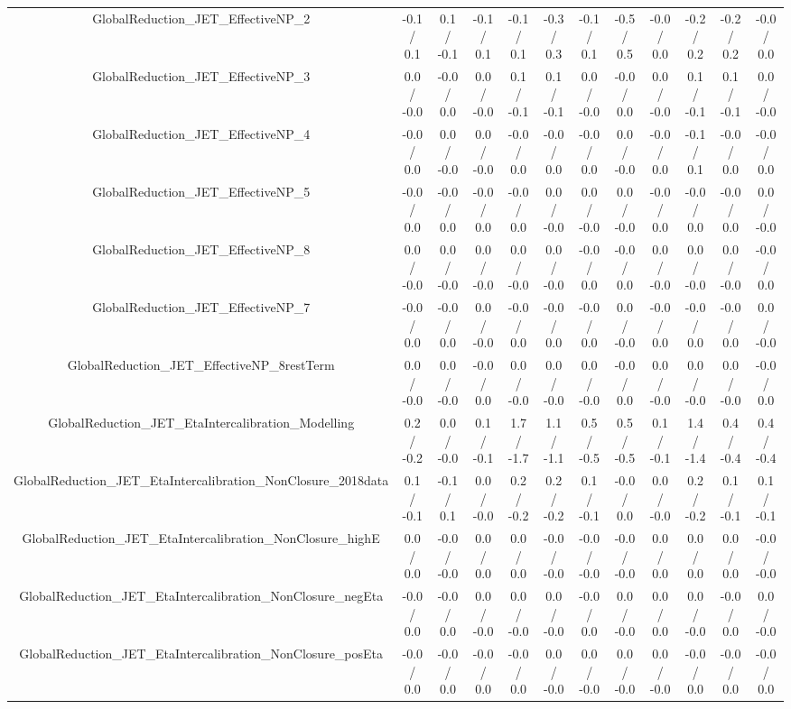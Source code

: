 \begin{table}[htbp]
\begin{center}
\begin{tabular}{|c|c|c|c|c|c|c|c|c|c|c|c|}
  GlobalReduction_JET_EffectiveNP_2 & -0.1 / 0.1 & 0.1 / -0.1 & -0.1 / 0.1 & -0.1 / 0.1 & -0.3 / 0.3 & -0.1 / 0.1 & -0.5 / 0.5 & -0.0 / 0.0 & -0.2 / 0.2 & -0.2 / 0.2 & -0.0 / 0.0 \\ 
  GlobalReduction_JET_EffectiveNP_3 & 0.0 / -0.0 & -0.0 / 0.0 & 0.0 / -0.0 & 0.1 / -0.1 & 0.1 / -0.1 & 0.0 / -0.0 & -0.0 / 0.0 & 0.0 / -0.0 & 0.1 / -0.1 & 0.1 / -0.1 & 0.0 / -0.0 \\ 
  GlobalReduction_JET_EffectiveNP_4 & -0.0 / 0.0 & 0.0 / -0.0 & 0.0 / -0.0 & -0.0 / 0.0 & -0.0 / 0.0 & -0.0 / 0.0 & 0.0 / -0.0 & -0.0 / 0.0 & -0.1 / 0.1 & -0.0 / 0.0 & -0.0 / 0.0 \\ 
  GlobalReduction_JET_EffectiveNP_5 & -0.0 / 0.0 & -0.0 / 0.0 & -0.0 / 0.0 & -0.0 / 0.0 & 0.0 / -0.0 & 0.0 / -0.0 & 0.0 / -0.0 & -0.0 / 0.0 & -0.0 / 0.0 & -0.0 / 0.0 & 0.0 / -0.0 \\ 
  GlobalReduction_JET_EffectiveNP_8 & 0.0 / -0.0 & 0.0 / -0.0 & 0.0 / -0.0 & 0.0 / -0.0 & 0.0 / -0.0 & -0.0 / 0.0 & -0.0 / 0.0 & 0.0 / -0.0 & 0.0 / -0.0 & 0.0 / -0.0 & -0.0 / 0.0 \\ 
  GlobalReduction_JET_EffectiveNP_7 & -0.0 / 0.0 & -0.0 / 0.0 & 0.0 / -0.0 & -0.0 / 0.0 & -0.0 / 0.0 & -0.0 / 0.0 & 0.0 / -0.0 & -0.0 / 0.0 & -0.0 / 0.0 & -0.0 / 0.0 & 0.0 / -0.0 \\ 
  GlobalReduction_JET_EffectiveNP_8restTerm & 0.0 / -0.0 & 0.0 / -0.0 & -0.0 / 0.0 & 0.0 / -0.0 & 0.0 / -0.0 & 0.0 / -0.0 & -0.0 / 0.0 & 0.0 / -0.0 & 0.0 / -0.0 & 0.0 / -0.0 & -0.0 / 0.0 \\ 
  GlobalReduction_JET_EtaIntercalibration_Modelling & 0.2 / -0.2 & 0.0 / -0.0 & 0.1 / -0.1 & 1.7 / -1.7 & 1.1 / -1.1 & 0.5 / -0.5 & 0.5 / -0.5 & 0.1 / -0.1 & 1.4 / -1.4 & 0.4 / -0.4 & 0.4 / -0.4 \\ 
  GlobalReduction_JET_EtaIntercalibration_NonClosure_2018data & 0.1 / -0.1 & -0.1 / 0.1 & 0.0 / -0.0 & 0.2 / -0.2 & 0.2 / -0.2 & 0.1 / -0.1 & -0.0 / 0.0 & 0.0 / -0.0 & 0.2 / -0.2 & 0.1 / -0.1 & 0.1 / -0.1 \\ 
  GlobalReduction_JET_EtaIntercalibration_NonClosure_highE & 0.0 / 0.0 & -0.0 / -0.0 & 0.0 / 0.0 & 0.0 / 0.0 & -0.0 / -0.0 & -0.0 / -0.0 & -0.0 / -0.0 & 0.0 / 0.0 & 0.0 / 0.0 & 0.0 / 0.0 & -0.0 / -0.0 \\ 
  GlobalReduction_JET_EtaIntercalibration_NonClosure_negEta & -0.0 / 0.0 & -0.0 / 0.0 & 0.0 / -0.0 & 0.0 / -0.0 & 0.0 / -0.0 & -0.0 / 0.0 & 0.0 / -0.0 & 0.0 / 0.0 & 0.0 / -0.0 & -0.0 / 0.0 & 0.0 / -0.0 \\ 
  GlobalReduction_JET_EtaIntercalibration_NonClosure_posEta & -0.0 / 0.0 & -0.0 / 0.0 & -0.0 / 0.0 & -0.0 / 0.0 & 0.0 / -0.0 & 0.0 / -0.0 & 0.0 / -0.0 & 0.0 / -0.0 & -0.0 / 0.0 & -0.0 / 0.0 & -0.0 / 0.0 \\ 

\end{tabular}
\end{center}
\end{table}

